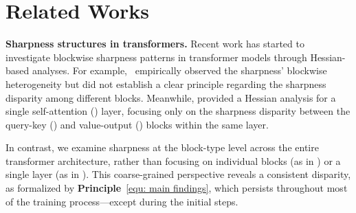 \section{Related Works}
\label{section: related works}







{\bf Sharpness structures in transformers.} Recent work has started to investigate blockwise sharpness patterns in transformer models through Hessian-based analyses.
For example,~\citet{zhang2024transformers} empirically observed the sharpness' blockwise heterogeneity  but did not establish a clear principle regarding the sharpness disparity among different blocks. Meanwhile, \citet{ormaniec2024does} provided a Hessian analysis for a single self-attention (\SA) layer, focusing only on the  sharpness disparity between the query-key (\QK) and value-output (\VO) blocks within the same layer. 


In contrast, we examine sharpness at the block-type level across the entire transformer architecture, rather than focusing on individual blocks (as in \citet{zhang2024transformers}) or a single layer (as in \citet{ormaniec2024does}). This coarse-grained perspective reveals a consistent  disparity, as formalized by \textbf{Principle}~\eqref{equ: main findings},  which persists throughout most of the training process—except during the initial steps.


